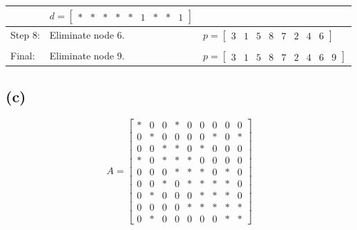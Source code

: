 \documentclass[11pt]{article}
\theoremstyle{definition}
\theoremstyle{remark}
\newcommand{\newquestion}{\hrulefill\vspace{-0.8\baselineskip}\\\null\hrulefill\vspace{-1.0\baselineskip}}
\newcommand{\newpart}{\vspace{-0.5\baselineskip}\hrulefill\vspace{-1.3\baselineskip}}
\theoremstyle{plain}
\begin{document}
\begin{tabular}{m{1.2cm}m{3cm}| >{\centering\arraybackslash}l}
\begin{tikzpicture}[scale=0.4]
          \end{tikzpicture}&
                             $d=\left[\begin{array}{ccccccccc}
                                        *&*&*&*&*&1&*&*&1
                                      \end{array}
                                                         \right]$\\\hline
  Step 8: & Eliminate node 6. &
                                $p=\left[\begin{array}{ccccccccc}
                                           3 & 1 & 5 & 8 & 7 & 2 & 4 & 6
                                         \end{array}
                                                           \right]$\\
          &\\\hline
  Final: & Eliminate node 9. &
                               $p=\left[\begin{array}{ccccccccc}
                                          3 & 1 & 5 & 8 & 7 & 2 & 4 & 6 & 9
                                        \end{array}
                                                                          \right]$\\
\end{tabular}\newpage

\newpart
\subsection*{(c)}
\begin{equation*}
  A=\left[
    \begin{array}{ccccccccc}
      *&0&0&*&0&0&0&0&0\\
      0&*&0&0&0&0&*&0&*\\
      0&0&*&*&0&*&0&0&0\\
      *&0&*&*&*&0&0&0&0\\
      0&0&0&*&*&*&0&*&0\\
      0&0&*&0&*&*&*&*&0\\
      0&*&0&0&0&*&*&*&0\\
      0&0&0&0&*&*&*&*&*\\
      0&*&0&0&0&0&0&*&*
    \end{array}\right]
\end{equation*}

\newquestion
%
%
\end{document}
